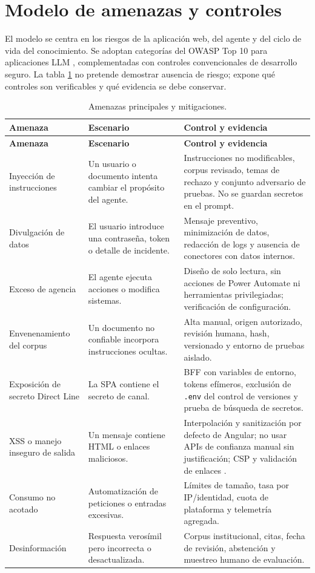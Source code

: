 \section{Modelo de amenazas y controles}

El modelo se centra en los riesgos de la aplicaci\'on web, del agente y del ciclo de vida del conocimiento. Se adoptan categor\'ias del OWASP Top 10 para aplicaciones LLM \cite{owaspLlm2026}, complementadas con controles convencionales de desarrollo seguro. La tabla \ref{tab:amenazas} no pretende demostrar ausencia de riesgo; expone qu\'e controles son verificables y qu\'e evidencia se debe conservar.

\begin{longtable}{p{}p{}p{}}
\caption{Amenazas principales y mitigaciones.}\label{tab:amenazas}\\
\toprule
\textbf{Amenaza} & \textbf{Escenario} & \textbf{Control y evidencia}\\
\midrule
\endfirsthead
\toprule
\textbf{Amenaza} & \textbf{Escenario} & \textbf{Control y evidencia}\\
\midrule
\endhead
Inyecci\'on de instrucciones & Un usuario o documento intenta cambiar el prop\'osito del agente. & Instrucciones no modificables, corpus revisado, temas de rechazo y conjunto adversario de pruebas. No se guardan secretos en el prompt.\\
Divulgaci\'on de datos & El usuario introduce una contrase\~na, token o detalle de incidente. & Mensaje preventivo, minimizaci\'on de datos, redacci\'on de logs y ausencia de conectores con datos internos.\\
Exceso de agencia & El agente ejecuta acciones o modifica sistemas. & Dise\~no de solo lectura, sin acciones de Power Automate ni herramientas privilegiadas; verificaci\'on de configuraci\'on.\\
Envenenamiento del corpus & Un documento no confiable incorpora instrucciones ocultas. & Alta manual, origen autorizado, revisi\'on humana, hash, versionado y entorno de pruebas aislado.\\
Exposici\'on de secreto Direct Line & La SPA contiene el secreto de canal. & BFF con variables de entorno, tokens ef\'imeros, exclusi\'on de \texttt{.env} del control de versiones y prueba de b\'usqueda de secretos.\\
XSS o manejo inseguro de salida & Un mensaje contiene HTML o enlaces maliciosos. & Interpolaci\'on y sanitizaci\'on por defecto de Angular; no usar APIs de confianza manual sin justificaci\'on; CSP y validaci\'on de enlaces \cite{angularSecurity}.\\
Consumo no acotado & Automatizaci\'on de peticiones o entradas excesivas. & L\'imites de tama\~no, tasa por IP/identidad, cuota de plataforma y telemetr\'ia agregada.\\
Desinformaci\'on & Respuesta veros\'imil pero incorrecta o desactualizada. & Corpus institucional, citas, fecha de revisi\'on, abstenci\'on y muestreo humano de evaluaci\'on.\\
\bottomrule
\end{longtable}

